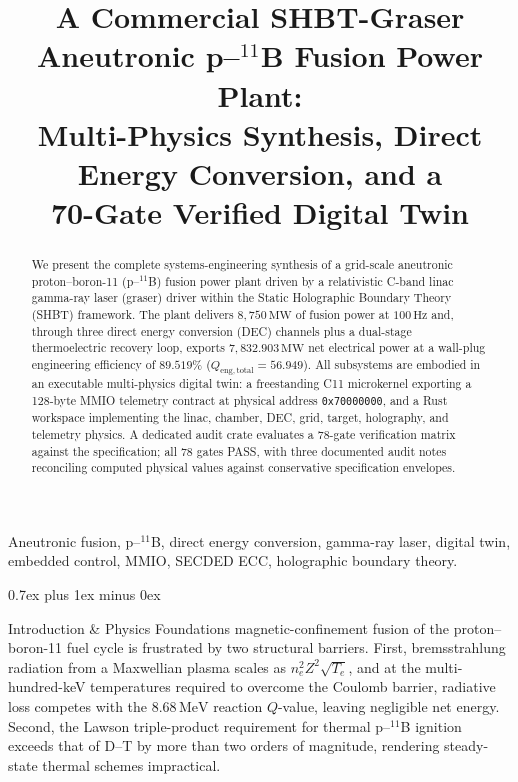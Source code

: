 \documentclass[11pt,journal,compsoc]{IEEEtran}
\title{A Commercial SHBT-Graser Aneutronic p--$^{11}$B Fusion Power Plant:\\
Multi-Physics Synthesis, Direct Energy Conversion, and a\\
70-Gate Verified Digital Twin}
\author{}
\makeatletter
\def\section{\@startsection{section}{1}{\z@}{-3.5ex plus -2ex minus -1.5ex}%
{0.7ex plus 1ex minus 0ex}{\normalfont\sublargesize\sffamily\bfseries\scshape
\raggedright\hyphenpenalty=10000\exhyphenpenalty=10000\relax}}
\newcommand{\MW}{\,\mathrm{MW}}
\newcommand{\MeV}{\,\mathrm{MeV}}
\makeatother
\begin{document}
\maketitle

\begin{abstract}
We present the complete systems-engineering synthesis of a grid-scale
aneutronic proton--boron-11 (p--$^{11}$B) fusion power plant driven by a
relativistic C-band linac gamma-ray laser (graser) driver within the Static
Holographic Boundary Theory (SHBT) framework. The plant delivers
$8{,}750\MW$ of fusion power at $100\,\mathrm{Hz}$ and, through three direct
energy conversion (DEC) channels plus a dual-stage thermoelectric recovery
loop, exports $7{,}832.903\MW$ net electrical power at a wall-plug
engineering efficiency of $89.519\%$ ($Q_{\mathrm{eng,total}} = 56.949$).
All subsystems are embodied in an executable multi-physics digital twin: a
freestanding C11 microkernel exporting a 128-byte MMIO telemetry contract at
physical address \texttt{0x70000000}, and a Rust workspace implementing the
linac, chamber, DEC, grid, target, holography, and telemetry physics. A
dedicated audit crate evaluates a 78-gate verification matrix against the
specification; all 78 gates PASS, with three documented audit notes
reconciling computed physical values against conservative specification
envelopes.
\end{abstract}

\begin{IEEEkeywords}
Aneutronic fusion, p--$^{11}$B, direct energy conversion, gamma-ray laser,
digital twin, embedded control, MMIO, SECDED ECC, holographic boundary
theory.
\end{IEEEkeywords}

\section{Introduction \& Physics Foundations}
 magnetic-confinement fusion of the
proton--boron-11 fuel cycle is frustrated by two structural barriers.
First, bremsstrahlung radiation from a Maxwellian plasma scales as
$n_e^2 Z^2 \sqrt{T_e}$, and at the multi-hundred-keV temperatures required
to overcome the Coulomb barrier, radiative loss competes with the
$8.68\MeV$ reaction $Q$-value, leaving negligible net energy. Second, the
Lawson triple-product requirement for thermal p--$^{11}$B ignition exceeds
that of D--T by more than two orders of magnitude, rendering steady-state
thermal schemes impractical.
\end{document}
